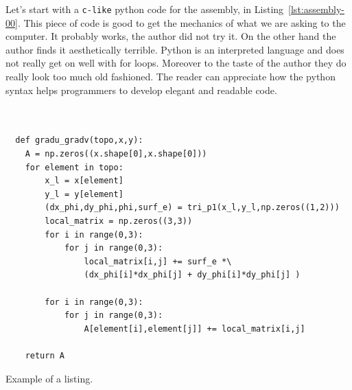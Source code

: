 \documentclass[11pt]{amsart}
\begin{document}
Let's start with a \texttt{c-like} python code for the assembly, in 
Listing~\ref{lst:assembly-00}. This piece of code is good to get 
the mechanics of what we are asking to the computer. It probably 
works, the author did not try it. On the other hand the author finds it 
aesthetically terrible. Python is an interpreted language and does not 
really get on well with for loops. Moreover to the taste of the author they 
do really look too much old fashioned. The reader can appreciate how 
the python syntax helps programmers to develop elegant and readable code.

\begin{listing}[H]
\begin{verbatim}
               

  def gradu_gradv(topo,x,y):
    A = np.zeros((x.shape[0],x.shape[0]))
    for element in topo:
        x_l = x[element]
        y_l = y[element]
        (dx_phi,dy_phi,phi,surf_e) = tri_p1(x_l,y_l,np.zeros((1,2)))
        local_matrix = np.zeros((3,3))
        for i in range(0,3):
            for j in range(0,3):
                local_matrix[i,j] += surf_e *\ 
                (dx_phi[i]*dx_phi[j] + dy_phi[i]*dy_phi[j] )
            
        for i in range(0,3):
            for j in range(0,3):
                A[element[i],element[j]] += local_matrix[i,j]

    return A
\end{verbatim}
\caption{Example of a listing.}
\label{lst:assembly-00}
\end{listing}
\end{document}

